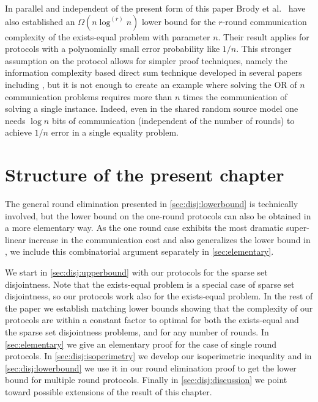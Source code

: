 In parallel and independent of the present form of this paper
Brody et al.\ \cite{BrodyCK2012} have also established an
$\Omega(n\log^{(r)}n)$ lower bound for the $r$-round
communication complexity of the exists-equal problem with
parameter $n$. Their result applies for protocols with a
polynomially small error probability like $1/n$. This stronger
assumption on the protocol allows for simpler proof techniques,
namely the information complexity based direct sum technique
developed in several papers including
\cite{Ablayev1996,ChakrabartiSWY2001}, but it is not enough to
create an example where solving the OR of $n$ communication
problems requires more than $n$ times the communication of
solving a single instance. Indeed, even in the shared random
source model one needs $\log n$ bits of communication
(independent of the number of rounds) to achieve $1/n$ error in
a single equality problem.

\section{Structure of the present chapter}
\label{sec:disj:map}

The general round elimination presented in
\autoref{sec:disj:lowerbound} is technically involved, but the lower bound
on the one-round protocols can also be obtained in a more
elementary way. As the one round case exhibits the most dramatic
super-linear increase in the communication cost and also
generalizes the lower bound in \cite{MolinaroWY2013}, we include
this combinatorial argument separately in
\autoref{sec:elementary}.

We start in \autoref{sec:disj:upperbound} with our protocols for the
sparse set disjointness. Note that the exists-equal problem is a
special case of sparse set disjointness, so our protocols work
also for the exists-equal problem. In the rest of the paper we
establish matching lower bounds showing that the complexity of
our protocols are within a constant factor to optimal for both
the exists-equal and the sparse set disjointness problems, and
for any number of rounds. In \autoref{sec:elementary} we give an
elementary proof for the case of single round protocols. In
\autoref{sec:disj:isoperimetry} we develop our isoperimetric
inequality and in \autoref{sec:disj:lowerbound} we use it in our
round elimination proof to get the lower bound for multiple
round protocols. Finally in \autoref{sec:disj:discussion} we point
toward possible extensions of the result of this chapter.


